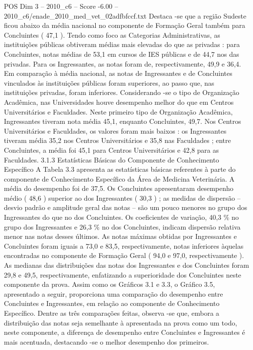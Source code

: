 \begin{textsample}{POS Dim 3 – 2010\_c6 – Score -6.00 – 2010\_c6/enade\_2010\_med\_vet\_02adfbfccf.txt}
Destaca -se que a região Sudeste ficou abaixo da média nacional no componente de Formação Geral também para Concluintes ( 47,1 ).
Tendo como foco as Categorias Administrativas, as instituições públicas obtiveram médias mais elevadas do que as privadas : para Concluintes, notas médias de 53,1 em cursos de IES públicas e de 44,7 nos das privadas.
Para os Ingressantes, as notas foram de, respectivamente, 49,9 e 36,4.
Em comparação à média nacional, as notas de Ingressantes e de Concluintes vinculados às instituições públicas foram superiores, ao passo que, nas instituições privadas, foram inferiores.
Considerando -se o tipo de Organização Acadêmica, nas Universidades houve desempenho melhor do que em Centros Universitários e Faculdades.
Neste primeiro tipo de Organização Acadêmica, Ingressantes tiveram nota média 45,1, enquanto Concluintes, 49,7.
Nos Centros Universitários e Faculdades, os valores foram mais baixos : os Ingressantes tiveram média 35,2 nos Centros Universitários e 35,8 nas Faculdades ; entre Concluintes, a média foi 45,1 para Centros Universitários e 42,8 para as Faculdades. 3.1.3 Estatísticas Básicas do Componente de Conhecimento Específico A Tabela 3.3 apresenta as estatísticas básicas referentes à parte do componente de Conhecimento Específico da Área de Medicina Veterinária.
A média do desempenho foi de 37,5.
Os Concluintes apresentaram desempenho médio ( 48,6 ) superior ao dos Ingressantes ( 30,3 ) ; as medidas de dispersão – desvio padrão e amplitude geral das notas – são um pouco menores no grupo dos Ingressantes do que no dos Concluintes.
Os coeficientes de variação, 40,3 \% no grupo dos Ingressantes e 26,3 \% no dos Concluintes, indicam dispersão relativa menor nas notas desses últimos.
As notas máximas obtidas por Ingressantes e Concluintes foram iguais a 73,0 e 83,5, respectivamente, notas inferiores àquelas encontradas no componente de Formação Geral ( 94,0 e 97,0, respectivamente ).
As medianas das distribuições das notas dos Ingressantes e dos Concluintes foram 29,8 e 49,5, respectivamente, enfatizando a superioridade dos Concluintes neste componente da prova.
Assim como os Gráficos 3.1 e 3.3, o Gráfico 3.5, apresentado a seguir, proporciona uma comparação do desempenho entre Concluintes e Ingressantes, em relação ao componente de Conhecimento Específico.
Dentre as três comparações feitas, observa -se que, embora a distribuição das notas seja semelhante à apresentada na prova como um todo, neste componente, a diferença de desempenho entre Concluintes e Ingressantes é mais acentuada, destacando -se o melhor desempenho dos primeiros.

\end{textsample}

